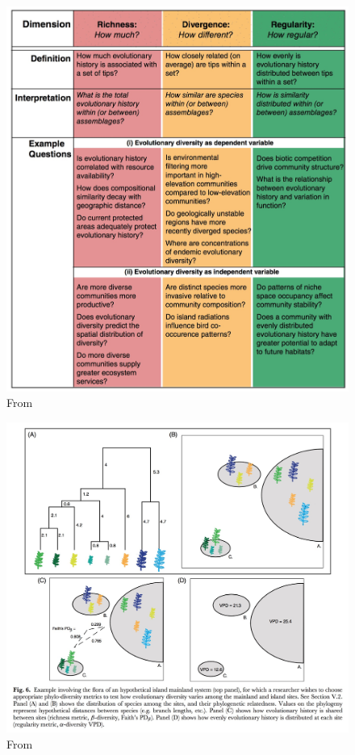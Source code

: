 \documentclass[]{book}
\theoremstyle{definition}
\theoremstyle{definition}
\theoremstyle{remark}
\begin{document}
\begin{figure}
\centering
\includegraphics{Images/Tucker_2016/Three_type_summary.jpg}
\caption{From \citet{Tucker2016}}
\end{figure}

\begin{figure}
\centering
\includegraphics{Images/Tucker_2016/tutorial.jpg}
\caption{From \citet{Tucker2016}}
\end{figure}
\end{document}
